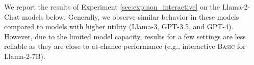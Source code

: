 We report the results of Experiment \ref{sec:exp:non_interactive} on the Llama-2-Chat models below. Generally, we observe similar behavior in these models compared to models with higher utility (Llama-3, GPT-3.5, and GPT-4). However, due to the limited model capacity, results for a few settings are less reliable as they are close to at-chance performance (e.g., interactive \textsc{Basic} for Llama-2-7B).

\begin{table}[h!]
    \centering
\end{table}
